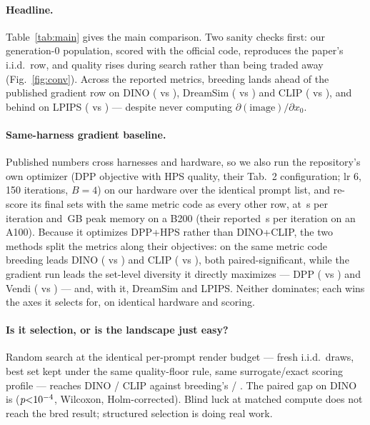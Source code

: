 \documentclass[10pt,twocolumn,letterpaper]{article}
\begin{document}
\paragraph{Headline.} Table~\ref{tab:main} gives the main comparison. Two
sanity checks first: our generation-0 population, scored with the official
code, reproduces the paper's i.i.d.\ row, and quality rises during search
rather than being traded away (Fig.~\ref{fig:conv}). Across the reported
metrics, breeding lands ahead of the published gradient row on DINO
(\nbBredDino{} vs \nbPaperGradDino), DreamSim (\nbBredDreamsim{} vs
\nbPaperGradDreamsim) and CLIP (\nbBredClip{} vs \nbPaperGradClip), and behind
on LPIPS (\nbBredLpips{} vs \nbPaperGradLpips) --- despite never computing
$\partial(\mathrm{image})/\partial x_0$.

\ifdefined\nbGradSameDino
\paragraph{Same-harness gradient baseline.} Published numbers cross harnesses
and hardware, so we also run the repository's own optimizer (DPP objective
with HPS quality, their Tab.~2 configuration; lr 6, 150 iterations, $B{=}4$)
on our hardware over the identical prompt list, and re-score its final sets
with the same metric code as every other row, at
\nbGradSameSecPerIter{}\,s per iteration and \nbGradSamePeakMemGb{}\,GB peak
memory on a B200 (their reported \nbPaperGradSecPerIterAHundred{}\,s per
iteration on an A100). Because it optimizes DPP+HPS rather than DINO+CLIP,
the two methods split the metrics along their objectives: on the same metric
code breeding leads DINO (\nbBredDino{} vs \nbGradSameDino) and CLIP
(\nbBredClip{} vs \nbGradSameClip), both paired-significant, while the
gradient run leads the set-level diversity it directly maximizes --- DPP
(\nbGradSameDpp{} vs \nbBredDpp) and Vendi (\nbGradSameVendi{} vs \nbBredVendi)
--- and, with it, DreamSim and LPIPS. Neither dominates; each wins the axes it
selects for, on identical hardware and scoring.
\fi

\ifdefined\nbRandDino
\paragraph{Is it selection, or is the landscape just easy?} Random search at
the identical per-prompt render budget --- fresh i.i.d.\ draws, best set kept
under the same quality-floor rule, same surrogate/exact scoring profile ---
reaches \nbRandDino{} DINO / \nbRandClip{} CLIP against breeding's
\nbBredDino{} / \nbBredClip.
\ifdefined\nbStatBredRandDinoP
The paired gap on DINO is \nbStatBredRandDinoDiff{}
($p{<}10^{-4}$, Wilcoxon, Holm-corrected).
\fi
Blind luck at matched compute does not reach the bred result; structured
selection is doing real work.
\fi
\end{document}
